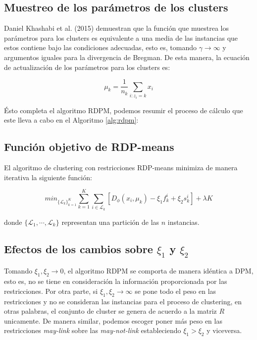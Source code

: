 \subsection{Muestreo de los parámetros de los clusters}

Daniel Khashabi et al. (2015) \cite{RDPM:2015} demuestran que la función que muestrea los parámetros para los clusters es equivalente a una media de las instancias que estos contiene bajo las condiciones adecuadas, esto es, tomando $\gamma \rightarrow \infty$ y argumentos iguales para la divergencia de Bregman. De esta manera, la ecuación de actualización de los parámetros para los clusters es:

\begin{equation}
\mu_k = \frac{1}{n_k} \sum_{i:z_i = k} x_i
\label{eqn61}
\end{equation}

Ésto completa el algoritmo \acf{RDPM}, podemos resumir el proceso de cálculo que este lleva a cabo en el Algoritmo \ref{alg:rdpm}:

\subsection{Función objetivo de RDP-means}

\begin{teorema}
	
	El algoritmo de clustering con restricciones RDP-means minimiza de manera iterativa la siguiente función:
	
	\begin{equation}
	min_{\{\mathcal{L}_k\}_{k=1}^K} \sum_{k=1}^{K} \sum_{i \in \mathcal{L}_k} \left[D_{\phi}(x_i, \mu_k) - \xi_1 f_{k}^i  + \xi_2 s_{k}^i\right] + \lambda K
	\label{eqn60}
	\end{equation}
	
	donde $\{\mathcal{L}_1, \cdots, \mathcal{L}_k\}$ representan una partición de las $n$ instancias.
	
\end{teorema}

\subsection{Efectos de los cambios sobre $\xi_1$ y $\xi_2$}

Tomando $\xi_1, \xi_2 \rightarrow 0$, el algoritmo \acs{RDPM} se comporta de manera idéntica a \acs{DPM}, esto es, no se tiene en consideración la información proporcionada por las restricciones. Por otra parte, si $\xi_1, \xi_2 \rightarrow \infty$ se pone todo el peso en las restricciones y no se consideran las instancias para el proceso de clustering, en otras palabras, el conjunto de cluster se genera de acuerdo a la matriz $R$ unicamente. De manera similar, podemos escoger poner más peso en las restricciones \textit{may-link} sobre las \textit{may-not-link} estableciendo $\xi_1 > \xi_2$ y viceversa.

